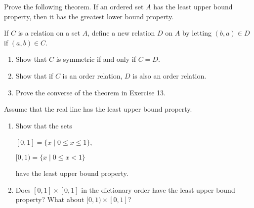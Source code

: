   \begin{exercise}[Munkres 3.13]
    Prove the following theorem. If an ordered set $A$ has the least upper bound property, then it has the greatest lower bound property.
  \end{exercise}
  \begin{solution}
    
  \end{solution}

  \begin{exercise}[Munkres 3.14]
    If $C$ is a relation on a set $A$, define a new relation $D$ on $A$ by letting $(b, a) \in D$ if $(a, b) \in C$.
    \begin{enumerate}
      \item Show that $C$ is symmetric if and only if $C = D$.
      \item Show that if $C$ is an order relation, $D$ is also an order relation.
      \item Prove the converse of the theorem in Exercise 13.
    \end{enumerate}
  \end{exercise}
  \begin{solution}
    
  \end{solution}

  \begin{exercise}[Munkres 3.15]
    Assume that the real line has the least upper bound property.
    \begin{enumerate}
      \item Show that the sets

      $[0, 1] = \{x \mid 0 \leq x \leq 1\}$,

      $[0, 1) = \{x \mid 0 \leq x < 1\}$

      have the least upper bound property.
      \item Does $[0, 1] \times [0, 1]$ in the dictionary order have the least upper bound property? What about $[0, 1) \times [0, 1]$?
    \end{enumerate}
  \end{exercise}
  \begin{solution}
    
  \end{solution}
  
